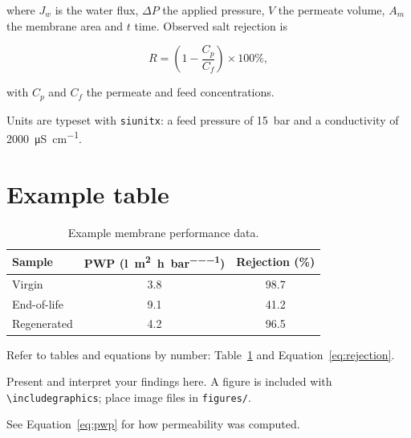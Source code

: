 \noindent where $J_w$ is the water flux, $\Delta P$ the applied pressure,
$V$ the permeate volume, $A_m$ the membrane area and $t$ time. Observed salt
rejection is

\begin{equation}
  R = \left(1 - \frac{C_p}{C_f}\right) \times 100\%,
  \label{eq:rejection}
\end{equation}

\noindent with $C_p$ and $C_f$ the permeate and feed concentrations.

Units are typeset with \texttt{siunitx}: a feed pressure of
\SI{15}{\bar} and a conductivity of \SI{2000}{\micro\siemens\per\centi\metre}.

\section{Example table}

\begin{table}[htbp]
  \centering
  \caption{Example membrane performance data.}
  \label{tab:performance}
  \begin{tabular}{lcc}
    \toprule
    Sample & PWP (\si{\litre\per\square\metre\per\hour\per\bar}) & Rejection (\si{\percent}) \\
    \midrule
    Virgin       & 3.8 & 98.7 \\
    End-of-life   & 9.1 & 41.2 \\
    Regenerated  & 4.2 & 96.5 \\
    \bottomrule
  \end{tabular}
\end{table}

Refer to tables and equations by number: Table~\ref{tab:performance} and Equation~\eqref{eq:rejection}.


\label{ch:results}

Present and interpret your findings here. A figure is included with
\texttt{\textbackslash includegraphics}; place image files in \texttt{figures/}.


See Equation~\eqref{eq:pwp} for how permeability was computed.
